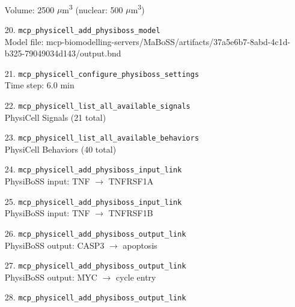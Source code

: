\begin{enumerate}
\hfill\\
\RaggedRight Volume: 2500 \ensuremath{\mu}m\textsuperscript{3} (nuclear: 500 \ensuremath{\mu}m\textsuperscript{3})
\item[20.] \texttt{mcp\_\allowbreak{}physicell\_\allowbreak{}add\_\allowbreak{}physiboss\_\allowbreak{}model}
\hfill\\
\RaggedRight Model file: mcp-biomodelling-servers/MaBoSS/artifacts/37a5e6b7-8abd-4c1d-b325-79049034d143/output.bnd
\item[21.] \texttt{mcp\_\allowbreak{}physicell\_\allowbreak{}configure\_\allowbreak{}physiboss\_\allowbreak{}settings}
\hfill\\
\RaggedRight Time step: 6.0 min
\item[22.] \texttt{mcp\_\allowbreak{}physicell\_\allowbreak{}list\_\allowbreak{}all\_\allowbreak{}available\_\allowbreak{}signals}
\hfill\\
\RaggedRight PhysiCell Signals (21 total)
\item[23.] \texttt{mcp\_\allowbreak{}physicell\_\allowbreak{}list\_\allowbreak{}all\_\allowbreak{}available\_\allowbreak{}behaviors}
\hfill\\
\RaggedRight PhysiCell Behaviors (40 total)
\item[24.] \texttt{mcp\_\allowbreak{}physicell\_\allowbreak{}add\_\allowbreak{}physiboss\_\allowbreak{}input\_\allowbreak{}link}
\hfill\\
\RaggedRight PhysiBoSS input: TNF \ensuremath{\rightarrow} TNFRSF1A
\item[25.] \texttt{mcp\_\allowbreak{}physicell\_\allowbreak{}add\_\allowbreak{}physiboss\_\allowbreak{}input\_\allowbreak{}link}
\hfill\\
\RaggedRight PhysiBoSS input: TNF \ensuremath{\rightarrow} TNFRSF1B
\item[26.] \texttt{mcp\_\allowbreak{}physicell\_\allowbreak{}add\_\allowbreak{}physiboss\_\allowbreak{}output\_\allowbreak{}link}
\hfill\\
\RaggedRight PhysiBoSS output: CASP3 \ensuremath{\rightarrow} apoptosis
\item[27.] \texttt{mcp\_\allowbreak{}physicell\_\allowbreak{}add\_\allowbreak{}physiboss\_\allowbreak{}output\_\allowbreak{}link}
\hfill\\
\RaggedRight PhysiBoSS output: MYC \ensuremath{\rightarrow} cycle entry
\item[28.] \texttt{mcp\_\allowbreak{}physicell\_\allowbreak{}add\_\allowbreak{}physiboss\_\allowbreak{}output\_\allowbreak{}link}
\hfill\\

\end{enumerate}
